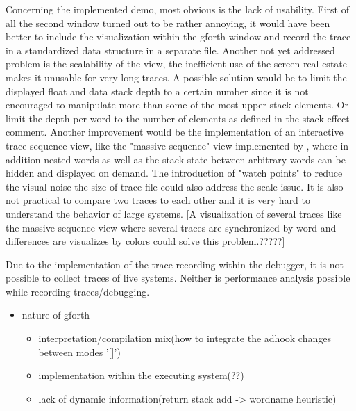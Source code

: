 Concerning the implemented demo, most obvious is the lack of usability. First of all the second window turned out to be rather annoying, it would have been better to include the visualization within the gforth window and record the trace in a standardized data structure in a separate file.
Another not yet addressed problem is the scalability of the view, the inefficient use of the screen real estate makes it unusable for very long traces. A possible solution would be to limit the displayed float and data stack depth to a certain number since it is not encouraged to manipulate more than some of the most upper stack elements. Or limit the depth per word to the number of elements as defined in the stack effect comment. Another improvement would be the implementation of an interactive trace sequence view, like the "massive sequence" view implemented by \cite{Cornelissen:2008:ETA:1454787.1454981}, where in addition nested words as well as the stack state between arbitrary words can be hidden and displayed on demand. The introduction of "watch points" to reduce the visual noise the size of trace file could also address the scale issue.
It is also not practical to compare two traces to each other and it is very hard to understand the behavior of large systems. [A visualization of several traces like the massive sequence view where several traces are synchronized by word and differences are visualizes by colors could solve this problem.?????]

Due to the implementation of the trace recording within the debugger, it is not possible to collect traces of live systems. Neither is performance analysis possible while recording traces/debugging.


\begin{itemize}
\item nature of gforth
	\begin{itemize}
	\item interpretation/compilation mix(how to integrate the adhook changes between modes '[]')
	\item implementation within the executing system(??)
	\item lack of dynamic information(return stack add -> wordname heuristic)
	\end{itemize}
\end{itemize}
